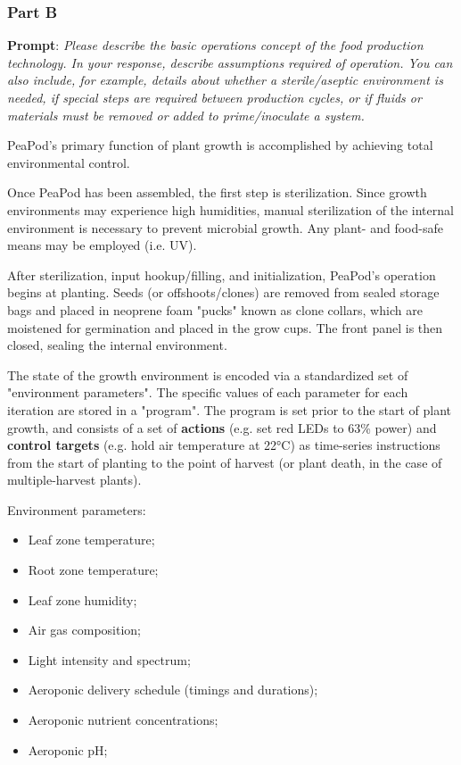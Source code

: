 \documentclass{report}
\begin{document}
\newpage

\subsubsection{Part B}
\label{sec:description-b}

\textbf{Prompt}: \textit{Please describe the basic operations concept of the food production technology. In your response, describe assumptions required of operation. You can also include, for example, details about whether a sterile/aseptic environment is needed, if special steps are required between production cycles, or if fluids or materials must be removed or added to prime/inoculate a system.}

PeaPod's primary function of plant growth is accomplished by achieving total environmental control. 

Once PeaPod has been assembled, the first step is sterilization. Since growth environments may experience high humidities, manual sterilization of the internal environment is necessary to prevent microbial growth. Any plant- and food-safe means may be employed (i.e. UV).

After sterilization, input hookup/filling, and initialization, PeaPod's operation begins at planting. Seeds (or offshoots/clones) are removed from sealed storage bags and placed in neoprene foam "pucks" known as clone collars, which are moistened for germination and placed in the grow cups. The front panel is then closed, sealing the internal environment.

The state of the growth environment is encoded via a standardized set of "environment parameters". The specific values of each parameter for each iteration are stored in a "program". The program is set prior to the start of plant growth, and consists of a set of \textbf{actions} (e.g. set red LEDs to 63\% power) and \textbf{control targets} (e.g. hold air temperature at 22°C) as time-series instructions from the start of planting to the point of harvest (or plant death, in the case of multiple-harvest plants).

Environment parameters:
\begin{itemize}
    \item Leaf zone temperature;
    \item Root zone temperature;
    \item Leaf zone humidity;
    \item Air gas composition;
    \item Light intensity and spectrum;
    \item Aeroponic delivery schedule (timings and durations);
    \item Aeroponic nutrient concentrations;
    \item Aeroponic pH;
\end{itemize}
\end{document}
